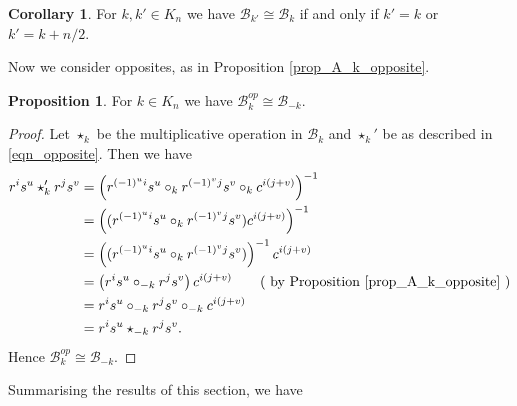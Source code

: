 \documentclass[reqno]{amsart}
\theoremstyle{definition}
\newtheorem{proposition}[theorem]{Proposition}
\newtheorem{corollary}[theorem]{Corollary}
\begin{document}
\begin{corollary}
For $ k,k' \in K_{n} $ we have $ \mathscr{B}_{k'} \cong \mathscr{B}_{k} $ if and only if $ k'=k $ or $ k'=k + n/2 $.
\end{corollary}

Now we consider opposites, as in  Proposition \ref{prop_A_k_opposite}.

\begin{proposition} \label{prop_B_k_opposite}
For $ k \in K_{n} $ we have $ \mathscr{B}_{k}^{op} \cong \mathscr{B}_{-k} $.  
\end{proposition}
\begin{proof}
Let $ \star_{k} $ be the multiplicative operation in $ \mathscr{B}_{k} $ and 
$ \star_{k}' $ be as described in \eqref{eqn_opposite}. Then we have
\begin{align*}
r^{i}s^{u} \star_{k}' r^{j}s^{v} &= \left( r^{(-1)^{u}i}s^{u} \circ_{k} r^{(-1)^{v}j}s^{v} \circ_{k} c^{i(j+v)} \right)^{-1} \\
&= \left( (r^{(-1)^{u}i}s^{u} \circ_{k} r^{(-1)^{v}j}s^{v}) c^{i(j+v)} \right)^{-1} \\
&= \left( (r^{(-1)^{u}i}s^{u} \circ_{k} r^{(-1)^{v}j}s^{v}) \right)^{-1} c^{i(j+v)}\\
&= \left(r^{i}s^{u} \circ_{-k} r^{j}s^{v} \right) c^{i(j+v)} \tag{ by Proposition \ref{prop_A_k_opposite} } \\
&= r^{i}s^{u} \circ_{-k} r^{j}s^{v} \circ_{-k} c^{i(j+v)} \\
&= r^{i}s^{u} \star_{-k} r^{j}s^{v}.
\end{align*}
Hence $ \mathscr{B}_{k}^{op} \cong \mathscr{B}_{-k} $.
\end{proof}

Summarising the results of this section, we have
\end{document}
